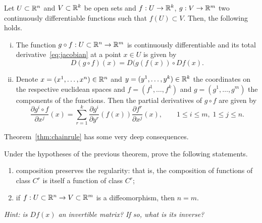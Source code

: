 \begin{theorem}\label{thm:chainrule}
Let $U\subset\mathbb{R}^n$ and $V\subset\mathbb{R}^k$ be open sets and $f: U \to \mathbb{R}^k$, $g: V\to\mathbb{R}^m$ two continuously differentiable functions such that $f(U)\subset V$.
Then, the following holds.
\begin{enumerate}[(i)]
  \item\label{thm:chainrule1} The function $g\circ f: U\subset\mathbb{R}^n \to\mathbb{R}^m$ is continuously differentiable and its total derivative~\eqref{eq:jacobian} at a point $x\in U$ is given by
\begin{equation}
  D(g\circ f)(x) = D(g(f(x)) \circ Df(x).
\end{equation}
\item\label{thm:chainrule2} Denote $x=(x^1, \ldots, x^n)\in\mathbb{R}^n$ and $y=(y^1,\ldots,y^k)\in\mathbb{R}^k$ the coordinates on the respective euclidean spaces and $f=(f^1,\ldots,f^k)$ and $g=(g^1,\ldots,g^m)$ the components of the functions. Then the partial derivatives of $g\circ f$ are given by
\begin{equation}
  \frac{\partial g^i\circ f}{\partial x^j}(x)
  = \sum_{r=1}^k \frac{\partial g^i}{\partial y^r}(f(x)) \frac{\partial f^r}{\partial x^j}(x),
\qquad 1\leq i \leq m,\; 1\leq j\leq n.
\end{equation}
\end{enumerate}
\end{theorem}

Theorem~\ref{thm:chainrule} has some very deep consequences.
\begin{exercise}
  Under the hypotheses of the previous theorem, prove the following statements.
  \begin{enumerate}
    \item composition preserves the regularity: that is, the composition of functions of class $C^r$ is itself a function of class $C^r$;
    \item if $f:U\subset\mathbb{R}^n\to V\subset\mathbb{R}^m$ is a diffeomorphism, then $n=m$.
  \end{enumerate}
  \textit{\small Hint: is $Df(x)$ an invertible matrix? If so, what is its inverse?} %
\end{exercise}

